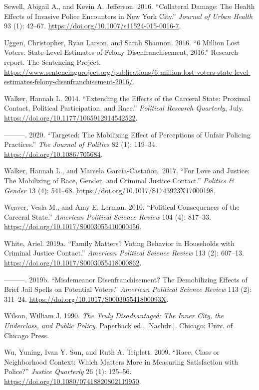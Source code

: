 \documentclass[
  12pt,
]{article}
\newlength{\cslhangindent}
\newenvironment{cslreferences}%
  {\setlength{\parindent}{0pt}%
  \everypar{\setlength{\hangindent}{\cslhangindent}}\ignorespaces}%
  {\par}
\begin{document}
\begin{cslreferences}
\leavevmode\hypertarget{ref-Sewell2016}{}%
Sewell, Abigail A., and Kevin A. Jefferson. 2016. ``Collateral Damage: The Health Effects of Invasive Police Encounters in New York City.'' \emph{Journal of Urban Health} 93 (1): 42--67. \url{https://doi.org/10.1007/s11524-015-0016-7}.

\leavevmode\hypertarget{ref-sentencing_2016}{}%
Uggen, Christopher, Ryan Larson, and Sarah Shannon. 2016. ``6 Million Lost Voters: State-Level Estimates of Felony Disenfranchisement, 2016.'' Research report. The Sentencing Project. \url{https://www.sentencingproject.org/publications/6-million-lost-voters-state-level-estimates-felony-disenfranchisement-2016/}.

\leavevmode\hypertarget{ref-Walker2014}{}%
Walker, Hannah L. 2014. ``Extending the Effects of the Carceral State: Proximal Contact, Political Participation, and Race.'' \emph{Political Research Quarterly}, July. \url{https://doi.org/10.1177/1065912914542522}.

\leavevmode\hypertarget{ref-Walker2020}{}%
---------. 2020. ``Targeted: The Mobilizing Effect of Perceptions of Unfair Policing Practices.'' \emph{The Journal of Politics} 82 (1): 119--34. \url{https://doi.org/10.1086/705684}.

\leavevmode\hypertarget{ref-Walker2017}{}%
Walker, Hannah L., and Marcela García-Castañon. 2017. ``For Love and Justice: The Mobilizing of Race, Gender, and Criminal Justice Contact.'' \emph{Politics \& Gender} 13 (4): 541--68. \url{https://doi.org/10.1017/S1743923X17000198}.

\leavevmode\hypertarget{ref-Weaver2010}{}%
Weaver, Vesla M., and Amy E. Lerman. 2010. ``Political Consequences of the Carceral State.'' \emph{American Political Science Review} 104 (4): 817--33. \url{https://doi.org/10.1017/S0003055410000456}.

\leavevmode\hypertarget{ref-White2019a}{}%
White, Ariel. 2019a. ``Family Matters? Voting Behavior in Households with Criminal Justice Contact.'' \emph{American Political Science Review} 113 (2): 607--13. \url{https://doi.org/10.1017/S0003055418000862}.

\leavevmode\hypertarget{ref-White2019}{}%
---------. 2019b. ``Misdemeanor Disenfranchisement? The Demobilizing Effects of Brief Jail Spells on Potential Voters.'' \emph{American Political Science Review} 113 (2): 311--24. \url{https://doi.org/10.1017/S000305541800093X}.

\leavevmode\hypertarget{ref-Wilson1990}{}%
Wilson, William J. 1990. \emph{The Truly Disadvantaged: The Inner City, the Underclass, and Public Policy}. Paperback ed., {[}Nachdr.{]}. Chicago: Univ. of Chicago Press.

\leavevmode\hypertarget{ref-Wu2009}{}%
Wu, Yuning, Ivan Y. Sun, and Ruth A. Triplett. 2009. ``Race, Class or Neighborhood Context: Which Matters More in Measuring Satisfaction with Police?'' \emph{Justice Quarterly} 26 (1): 125--56. \url{https://doi.org/10.1080/07418820802119950}.
\end{cslreferences}
\end{document}
